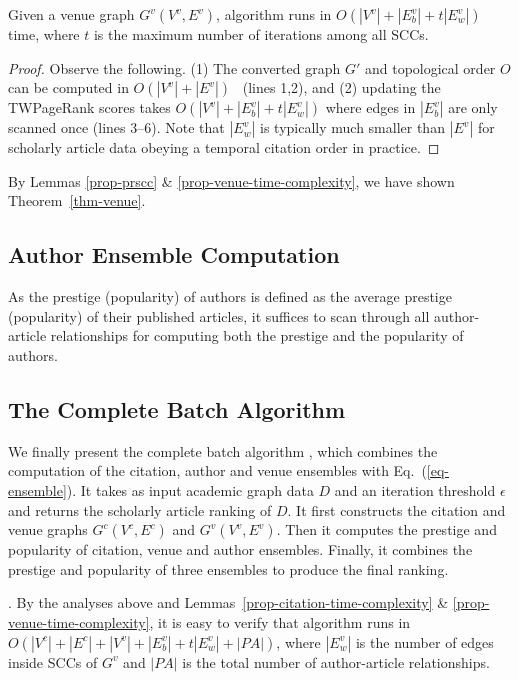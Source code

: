 {\begin{lemma}
\label{prop-venue-time-complexity}
Given a venue graph $G^v(V^v, E^v)$, algorithm \twprscc runs in  $O(|V^v|+|E^v_b|+t|E^v_w|)$ time, where $t$ is  the maximum number of iterations among all SCCs.
\end{lemma}

\begin{proof}
Observe the following. (1) The converted graph $G'$ and topological order $O$ can be computed in $O(|V^v|+|E^v|)$~\cite{CormenLRS01} (lines 1,2), and (2) updating the TWPageRank scores takes $O(|V^v|+|E^v_b|+t |E^v_w|)$ where edges in $|E^v_b|$ are only scanned once (lines 3--6). Note that $|E^v_w|$ is typically much smaller than $|E^v|$ for scholarly article data obeying a temporal citation order in practice.
\end{proof}

By Lemmas \ref{prop-prscc} \& \ref{prop-venue-time-complexity}, we have shown Theorem~\ref{thm-venue}.




\subsection{Author Ensemble Computation}

As the prestige (popularity) of authors is defined as the average prestige (popularity) of their published articles, it suffices to scan through all author-article  relationships for computing both the prestige and the popularity of authors.

\subsection{The Complete Batch Algorithm}
\label{subsec-bat-alg}
We finally present the complete batch algorithm \batensemble, which combines the computation of the citation, author and venue ensembles with Eq.~(\ref{eq-ensemble}). It takes as input academic graph data $D$ and an iteration threshold $\epsilon$ and returns the scholarly article ranking of $D$. It first constructs the citation and venue graphs $G^c(V^c,E^c)$ and $G^v(V^v,E^v)$. Then it computes the prestige and popularity of citation, venue and author ensembles.
Finally, it combines the prestige and popularity of three ensembles to produce the final ranking.

. By the analyses above and Lemmas~\ref{prop-citation-time-complexity} \& \ref{prop-venue-time-complexity}, it is easy to verify that algorithm \batensemble runs in $O(|V^c|+|E^c|+|V^v|+|E^v_b|+t|E^v_w|+|PA|)$, where $|E^v_w|$ is the number of edges inside SCCs of $G^v$ and $|PA|$
is the total number of author-article relationships.

}
